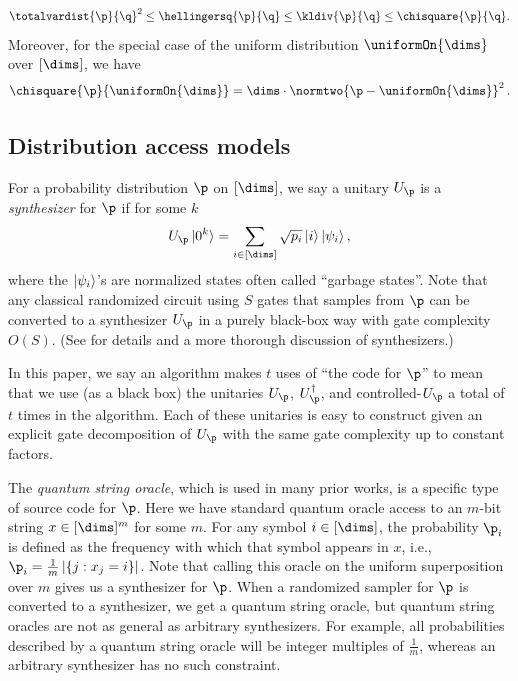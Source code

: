 \documentclass[11pt]{article}
\begin{document}
\begin{equation}  %
  \totalvardist{\p}{\q}^2 \leq \hellingersq{\p}{\q} \leq \kldiv{\p}{\q} \leq \chisquare{\p}{\q}.
\end{equation}
Moreover, for the special case of the uniform distribution $\uniformOn{\dims}$ over $[\dims]$, we have
\begin{equation}
\chisquare{\p}{\uniformOn{\dims}} = \dims\cdot \normtwo{\p-\uniformOn{\dims}}^2\,.
\end{equation}

\subsection{Distribution access models}

For a probability distribution $\p$ on $[\dims]$, we say a unitary $U_{\p}$ is a \emph{synthesizer} for $\p$ if for some $k$
\begin{equation}
  U_{\p}\ket{0^k} = \sum_{i\in[\dims]} \sqrt{p_i} \ket{i}\ket{\psi_i},
\end{equation}
where the $\ket{\psi_i}$'s are normalized states often called ``garbage states''. Note that any classical randomized circuit using $S$ gates that samples from $\p$ can be converted to a synthesizer $U_{\p}$ in a purely black-box way with gate complexity $O(S)$. (See \cite{KO23} for details and a more thorough discussion of synthesizers.)

In this paper, we say an algorithm makes $t$ uses of ``the code for $\p$'' to mean that we use (as a black box) the unitaries $U_{\p}$, $U_{\p}^\dagger$, and controlled-$U_{\p}$ a total of $t$ times in the algorithm. Each of these unitaries is easy to construct given an explicit gate decomposition of $U_{\p}$ with the same gate complexity up to constant factors.

The \emph{quantum string oracle}, which is used in many prior works, is a specific type of source code for $\p$. Here we have standard quantum oracle access to an $m$-bit string $x \in [\dims]^m$ for some $m$. For any symbol $i \in [\dims]$, the probability $\p_i$ is defined as the frequency with which that symbol appears in $x$, i.e., $\p_i = \frac{1}{m} \left| \{j:x_j=i\} \right|$. Note that calling this oracle on the uniform superposition over $m$ gives us a synthesizer for $\p$. When a randomized sampler for $\p$ is converted to a synthesizer, we get a quantum string oracle, but quantum string oracles are not as general as arbitrary synthesizers. For example, all probabilities described by a quantum string oracle will be integer multiples of $\frac{1}{m}$, whereas an arbitrary synthesizer has no such constraint.
\end{document}
